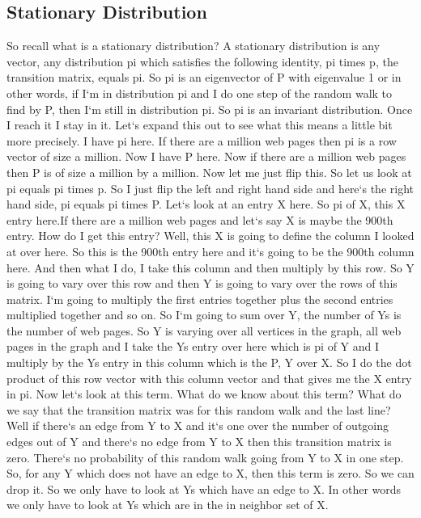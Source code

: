 \subsection{Stationary Distribution}
So recall what is a stationary distribution? A stationary distribution is any vector, any distribution pi which satisfies the following identity, pi times p, the transition matrix, equals pi.
So pi is an eigenvector of P with eigenvalue 1 or in other words, if I`m in distribution pi and I do one step of the random walk to find by P, then I`m still in distribution pi.
So pi is an invariant distribution.
Once I reach it I stay in it.
Let`s expand this out to see what this means a little bit more precisely.
I have pi here.
If there are a million web pages then pi is a row vector of size a million.
Now I have P here.
Now if there are a million web pages then P is of size a million by a million.
Now let me just flip this.
So let us look at pi equals pi times p.
So I just flip the left and right hand side and here`s the right hand side, pi equals pi times P\@.
Let`s look at an entry X here.
So pi of X, this X entry here.If there are a million web pages and let`s say X is maybe the 900th entry.
How do I get this entry? Well, this X is going to define the column I looked at over here.
So this is the 900th entry here and it`s going to be the 900th column here.
And then what I do, I take this column and then multiply by this row.
So Y is going to vary over this row and then Y is going to vary over the rows of this matrix.
I`m going to multiply the first entries together plus the second entries multiplied together and so on.
So I`m going to sum over Y, the number of Ys is the number of web pages.
So Y is varying over all vertices in the graph, all web pages in the graph and I take the Ys entry over here which is pi of Y and I multiply by the Ys entry in this column which is the P, Y over X\@.
So I do the dot product of this row vector with this column vector and that gives me the X entry in pi.
Now let`s look at this term.
What do we know about this term? What do we say that the transition matrix was for this random walk and the last line? Well if there`s an edge from Y to X and it`s one over the number of outgoing edges out of Y and there`s no edge from Y to X then this transition matrix is zero.
There`s no probability of this random walk going from Y to X in one step.
So, for any Y which does not have an edge to X, then this term is zero.
So we can drop it.
So we only have to look at Ys which have an edge to X\@.
In other words we only have to look at Ys which are in the in neighbor set of X\@.
